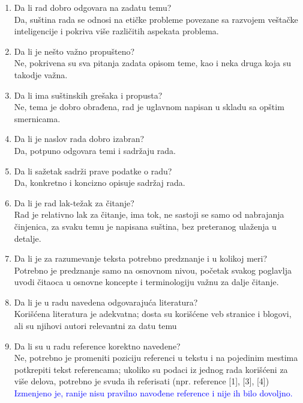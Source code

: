 \documentclass[a4paper]{report}
\newcommand{\odgovor}[1]{\textcolor{blue}{#1}}
\begin{document}
\begin{enumerate}
\item Da li rad dobro odgovara na zadatu temu?\\
Da, suština rada se odnosi na etičke probleme povezane sa razvojem veštačke inteligencije i pokriva više različitih aspekata problema.

\item Da li je nešto važno propušteno?\\
Ne, pokrivena su sva pitanja zadata opisom teme, kao i neka druga koja su takodje važna.

\item Da li ima suštinskih grešaka i propusta?\\
Ne, tema je dobro obrađena, rad je uglavnom napisan u skladu sa opštim smernicama.

\item Da li je naslov rada dobro izabran?\\
Da, potpuno odgovara temi i sadržaju rada.

\item Da li sažetak sadrži prave podatke o radu?\\
Da, konkretno i koncizno opisuje sadržaj rada.

\item Da li je rad lak-težak za čitanje?\\
Rad je relativno lak za čitanje, ima tok, ne sastoji se samo od nabrajanja činjenica, za svaku temu je napisana suština, bez preteranog ulaženja u detalje.

\item Da li je za razumevanje teksta potrebno predznanje i u kolikoj meri?\\
Potrebno je predznanje samo na osnovnom nivou, početak svakog poglavlja uvodi čitaoca u osnovne koncepte i terminologiju važnu za dalje čitanje.

\item Da li je u radu navedena odgovarajuća literatura?\\
Korišćena literatura je adekvatna; dosta su korišćene veb stranice i blogovi, ali su njihovi autori relevantni za datu temu

\item Da li su u radu reference korektno navedene?\\
Ne, potrebno je promeniti poziciju referenci u tekstu i na pojedinim mestima potkrepiti tekst referencama; ukoliko su podaci iz jednog rada korišćeni za više delova, potrebno je svuda ih referisati (npr. reference [1], [3], [4])\\
\odgovor{Izmenjeno je, ranije nisu pravilno navođene reference i nije ih bilo dovoljno.}


\end{enumerate}
\end{document}
